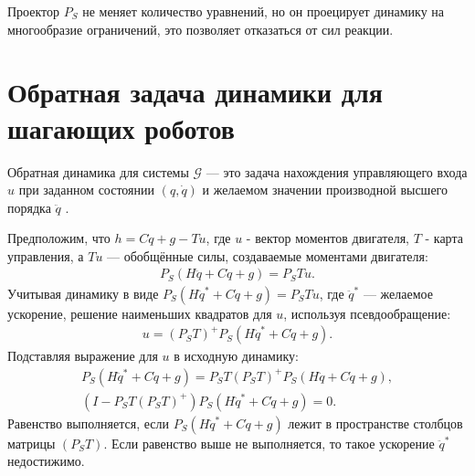 Проектор ${P}_S$ не меняет количество уравнений, но он проецирует динамику на многообразие ограничений, это позволяет отказаться от сил реакции.
%
\section{Обратная задача динамики для шагающих роботов}\label{sec:ch2/sect4}

Обратная динамика для системы $\mathcal{G}$ --- это задача нахождения управляющего входа ${u}$ при заданном состоянии $({q}, \dot{{q}})$ и желаемом значении производной высшего порядка $\ddot{{q}}$ \cite{Righetti2011}.
\begin{comment}
Динамика свободно плавающего робота с жёстким телом, подверженного внешним ограничениям, в общем случае задаётся следующим образом
\begin{equation}
	M \ddot{q} +h =S\T\tau + J_c\T \lambda,
\end{equation}
при $k$ ограничениях
\begin{equation}
	J_c \ddot{q} = b(q,\dot{q}),
\end{equation}
где $M \in \mathbb{R}^{n+6 \times n+6}$ - матрица инерции динамики жёсткого тела, $h \in \mathbb{R}^{n+6}$ - обобщённый вектор силы, содержащий эффекты Кориолиса, центробежные и гравитационные эффекты, $\tau \in \mathbb{R}^{n}$ - вектор воздействия и $S \in \mathbb{R}^{n \times n+6}$ - матрица выбора соединений, отражающая недостаточность действия - например, для большинства роботов с плавающей базой S будет матрицей тождества в первой подматрице $n \times n$, а в остальных местах - нули. 
$J_c \in \mathbb{R}^{k \times n+6}$ - Якобиан $k$ ограничений c $\lambda \in \mathbb{R}^{k}$ множителями Лагранжа, соответствующих ограничивающим силам.
\end{comment}
Предположим, что ${h} = {C}\dot{{q}} + {g} - {T}{u}$, где ${u}$ - вектор моментов двигателя, ${T}$ - карта управления, а ${T}{u}$ --- обобщённые силы, создаваемые моментами двигателя:
%
\begin{align}
	{P}_S({H}\ddot{{q}} + {C}\dot{{q}}+ {g}) = {P}_S{T}{u}.
\end{align}
%
Учитывая динамику в виде ${P}_S({H}\ddot{{q}}^* + {C}\dot{{q}}+ {g}) = {P}_S{T}{u}$, где $\ddot{{q}}^*$ --- желаемое ускорение, решение наименьших квадратов для ${u}$, используя псевдообращение:
%
\begin{align}
	{u}
	=
	({P}_S{T})^+{P}_S({H}\ddot{{q}}^* + {C}\dot{{q}}+ {g}).
\end{align}
%
Подставляя выражение для ${u}$ в исходную динамику:
%
\begin{align}
	{P}_S({H}\ddot{{q}}^* + {C}\dot{{q}}+ {g}) = {P}_S{T}({P}_S{T})^+{P}_S({H}\ddot{{q}} + {C}\dot{{q}}+ {g}),
	\\
	({I}-{P}_S{T}({P}_S{T})^+){P}_S({H}\ddot{{q}}^* + {C}\dot{{q}}+ {g}) = 0.
\end{align}
%
%
Равенство выполняется, если ${P}_S({H}\ddot{{q}}^* + {C}\dot{{q}}+ {g})$ лежит в пространстве столбцов матрицы $({P}_S{T})$.
Если равенство выше не выполняется, то такое ускорение $\ddot{{q}}^*$ недостижимо.

